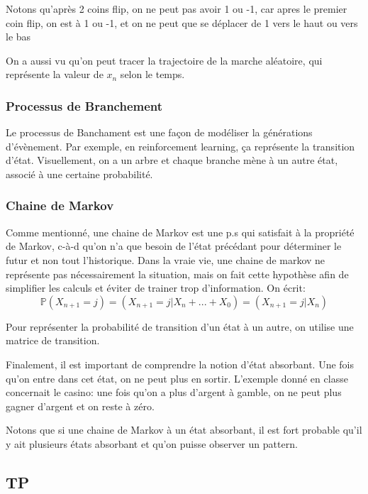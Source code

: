\documentclass{article}
\begin{document}
Notons qu'après 2 coins flip, on ne peut pas avoir 1 ou -1, car apres le
premier coin flip, on est à 1 ou -1, et on ne peut que se déplacer de 1
vers le haut ou vers le bas

On a aussi vu qu'on peut tracer la trajectoire de la marche aléatoire, qui
représente la valeur de $x_n$ selon le temps.

\subsubsection{Processus de Branchement}%
\label{ssub:processus_de_branchement}

Le processus de Banchament est une façon de modéliser la générations
d'évènement. Par exemple, en reinforcement learning, ça représente la
transition d'état. Visuellement, on a un arbre et chaque branche mène
à un autre état, associé à une certaine probabilité.

\subsubsection{Chaine de Markov}%
\label{ssub:chaine_de_markov}

Comme mentionné, une chaine de Markov est une p.s qui satisfait à la
propriété de Markov, c-à-d qu'on n'a que besoin de l'état précédant pour
déterminer le futur et non tout l'historique. Dans la vraie vie, une
chaine de markov ne représente pas nécessairement la situation, mais
on fait cette hypothèse afin de simplifier les calculs et éviter de
trainer trop d'information. On écrit:
$$ \mathbb{P} (X_{n+1} = j) = (X_{n+1} = j | X_n + ... + X_0) =
(X_{n+1} = j | X_n) $$

Pour représenter la probabilité de transition d'un état à un autre, on
utilise une matrice de transition.

Finalement, il est important de comprendre la notion d'état absorbant.
Une fois qu'on entre dans cet état, on ne peut plus en sortir. L'exemple
donné en classe concernait le casino: une fois qu'on a plus d'argent à
gamble, on ne peut plus gagner d'argent et on reste à zéro.

Notons que si une chaine de Markov à un état absorbant, il est fort
probable qu'il y ait plusieurs états absorbant et qu'on puisse observer
un pattern.

\subsection{TP}
\end{document}

